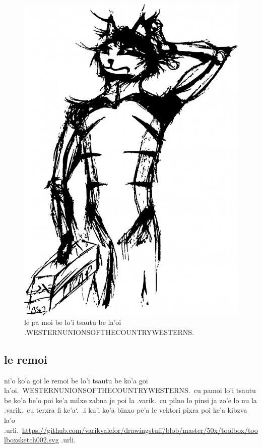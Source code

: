 \documentclass{report}
\newcommand\sds{\spacefactor\sfcode`.\ \space}
\begin{document}
\begin{figure}[ht]
	\centering
	\includegraphics[keepaspectratio, width=\textwidth, height=0.75\textheight]{50x/toolbox/s1v1.jpg}
	\caption[center]{le pa moi be lo'i tsautu be la'oi .WESTERNUNIONSOFTHECOUNTRYWESTERNS.}
\end{figure}

\subsection{le remoi}
ni'o ko'a goi le remoi be lo'i tsautu be ko'a goi la'oi.\ WESTERNUNIONSOFTHECOUNTRYWESTERNS.\ cu pamoi lo'i tsautu be ko'a be'o poi ke'a milxe zabna je poi la .varik.\ cu pilno lo pinsi ja zo'e lo nu la .varik.\ cu terxra fi ke'a\sds  .i ku'i ko'a binxo pe'a le vektori pixra poi ke'a kibzva la'o .urli.\ \url{https://github.com/varikvalefor/drawingstuff/blob/master/50x/toolbox/toolboxsketch002.svg} .urli.
\end{document}
